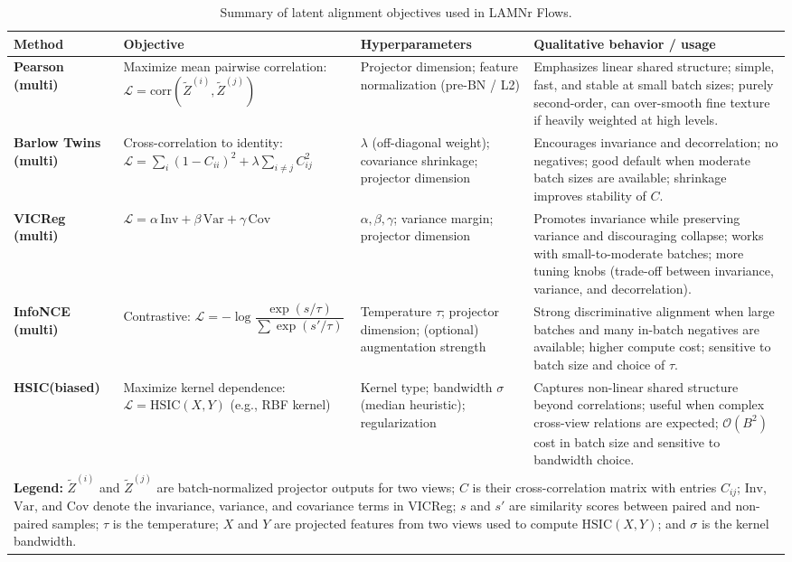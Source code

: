 \begin{table}[t]
\centering
\scriptsize
\begin{tabular}{p{1.5cm} p{3.75cm} p{3.1cm} p{5.5cm}}
\hline
\textbf{Method} &
\textbf{Objective} &
\textbf{Hyperparameters} &
\textbf{Qualitative behavior / usage} \\
\hline
\textbf{Pearson (multi)} &
Maximize mean pairwise correlation:
$\mathcal{L} = \mathrm{corr}(\tilde Z^{(i)}, \tilde Z^{(j)})$ &
Projector dimension; feature normalization (pre-BN / L2) &
Emphasizes linear shared structure; simple, fast, and stable at small batch sizes; purely second-order, can over-smooth fine texture if heavily weighted at high levels. \\[0.2em]
\textbf{Barlow Twins (multi)} &
Cross-correlation to identity: \newline
$\mathcal{L} = \sum_i (1 - C_{ii})^2 + \lambda \sum_{i \neq j} C_{ij}^2$ &
$\lambda$ (off-diagonal weight); covariance shrinkage; projector dimension &
Encourages invariance and decorrelation; no negatives; good default when moderate batch sizes are available; shrinkage improves stability of $C$. \\[0.2em]
\textbf{VICReg (multi)} &
$\mathcal{L} = \alpha\,\mathrm{Inv} + \beta\,\mathrm{Var} + \gamma\,\mathrm{Cov}$ &
$\alpha, \beta, \gamma$; variance margin; projector dimension &
Promotes invariance while preserving variance and discouraging collapse; works with small-to-moderate batches; more tuning knobs (trade-off between invariance, variance, and decorrelation). \\[0.2em]
\textbf{InfoNCE (multi)} &
Contrastive:  \newline
$\mathcal{L} = - \log \dfrac{\exp(s / \tau)}{\sum \exp(s' / \tau)}$ &
Temperature $\tau$; projector dimension; (optional) augmentation strength &
Strong discriminative alignment when large batches and many in-batch negatives are available; higher compute cost; sensitive to batch size and choice of $\tau$. \\[0.2em]
\textbf{HSIC}\newline \textbf{(biased)} &
Maximize kernel dependence: \newline
$\mathcal{L} = \mathrm{HSIC}(X,Y)$ (e.g., RBF kernel) &
Kernel type; bandwidth $\sigma$ (median heuristic); regularization &
Captures non-linear shared structure beyond correlations; useful when complex cross-view relations are expected; $\mathcal{O}(B^2)$ cost in batch size and sensitive to bandwidth choice. \\
\hline
\multicolumn{4}{p{13.85cm}}{\textbf{Legend:}
$\tilde Z^{(i)}$ and $\tilde Z^{(j)}$ are batch-normalized projector outputs for
two views; $C$ is their cross-correlation matrix with entries $C_{ij}$;
$\mathrm{Inv}$, $\mathrm{Var}$, and $\mathrm{Cov}$ denote the invariance,
variance, and covariance terms in VICReg; $s$ and $s'$ are similarity scores
between paired and non-paired samples; $\tau$ is the temperature; $X$ and $Y$
are projected features from two views used to compute $\mathrm{HSIC}(X,Y)$; and
$\sigma$ is the kernel bandwidth.} \\
\end{tabular}
\caption{Summary of latent alignment objectives used in LAMNr Flows.}
\label{tab:alignment}
\normalsize
\end{table}
